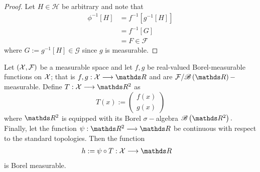 \begin{proof}
Let $H\in\mathcal{H}$ be arbitrary and note that
\begin{align*}
\phi^{-1}\left[H\right] & =f^{-1}\left[g^{-1}\left[H\right]\right]\\
 & =f^{-1}\left[G\right]\\
 & =F\in\mathcal{F}
\end{align*}
where $G:=g^{-1}\left[H\right]\in\mathcal{G}$ since $g$ is measurable.
\end{proof}
\begin{prop}
\label{prop:binaryOperationsMeasurableFunctions} Let $\left(\mathcal{X},\mathcal{F}\right)$
be a measurable space and let $f,g$ be real-valued Borel-measurable
functions on $\mathcal{X}$; that is $f,g:\X\longrightarrow\R$ and are $\mathcal{F}/\borel\left(\R\right)-$measurable.
Define $T:\X\longrightarrow\R^{2}$ as
\[
T\left(x\right):=\left(\begin{array}{c}
f\left(x\right)\\
g\left(x\right)
\end{array}\right)
\]
where $\R^{2}$ is equipped with its Borel $\sigma-$algebra $\borel\left(\R^{2}\right).$
Finally, let the function $\psi:\R^{2}\longrightarrow\R$ be continuous
with respect to the standard topologies. Then the function 
\begin{align*}
h & :=\psi\circ T:\X\longrightarrow\R
\end{align*}
is Borel measurable.
\end{prop}

